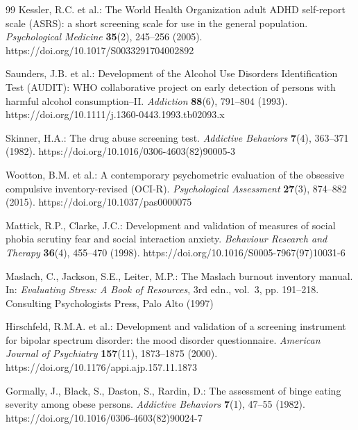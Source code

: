 \documentclass[sigconf]{acmart}
\begin{document}
\begin{thebibliography}{99}
 Kessler, R.C. et al.: The World Health Organization adult ADHD self-report scale (ASRS): a short screening scale for use in the general population. \textit{Psychological Medicine} \textbf{35}(2), 245--256 (2005). https://doi.org/10.1017/S0033291704002892

 Saunders, J.B. et al.: Development of the Alcohol Use Disorders Identification Test (AUDIT): WHO collaborative project on early detection of persons with harmful alcohol consumption--II. \textit{Addiction} \textbf{88}(6), 791--804 (1993). https://doi.org/10.1111/j.1360-0443.1993.tb02093.x

 Skinner, H.A.: The drug abuse screening test. \textit{Addictive Behaviors} \textbf{7}(4), 363--371 (1982). https://doi.org/10.1016/0306-4603(82)90005-3

 Wootton, B.M. et al.: A contemporary psychometric evaluation of the obsessive compulsive inventory-revised (OCI-R). \textit{Psychological Assessment} \textbf{27}(3), 874--882 (2015). https://doi.org/10.1037/pas0000075

 Mattick, R.P., Clarke, J.C.: Development and validation of measures of social phobia scrutiny fear and social interaction anxiety. \textit{Behaviour Research and Therapy} \textbf{36}(4), 455--470 (1998). https://doi.org/10.1016/S0005-7967(97)10031-6

 Maslach, C., Jackson, S.E., Leiter, M.P.: The Maslach burnout inventory manual. In: \textit{Evaluating Stress: A Book of Resources}, 3rd edn., vol.~3, pp. 191--218. Consulting Psychologists Press, Palo Alto (1997)

 Hirschfeld, R.M.A. et al.: Development and validation of a screening instrument for bipolar spectrum disorder: the mood disorder questionnaire. \textit{American Journal of Psychiatry} \textbf{157}(11), 1873--1875 (2000). https://doi.org/10.1176/appi.ajp.157.11.1873

 Gormally, J., Black, S., Daston, S., Rardin, D.: The assessment of binge eating severity among obese persons. \textit{Addictive Behaviors} \textbf{7}(1), 47--55 (1982). https://doi.org/10.1016/0306-4603(82)90024-7

\end{thebibliography}
\end{document}
